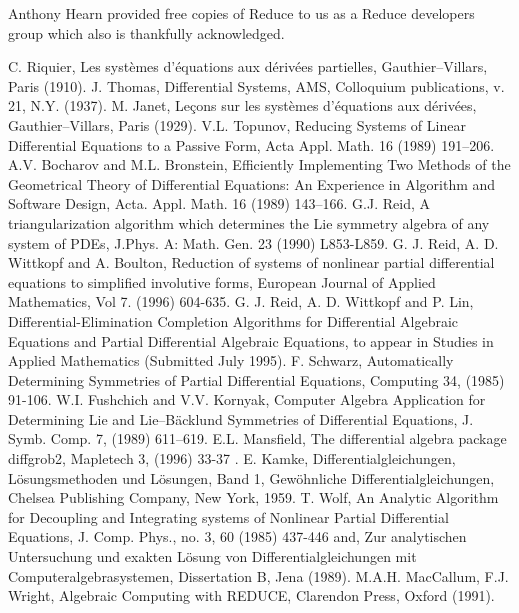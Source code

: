 \documentclass[12pt]{article}
\begin{document}
Anthony Hearn provided free copies of {\sc Reduce} to us as a
{\sc Reduce} developers group which also is thankfully acknowledged.

\begin{thebibliography}{99}
 C. Riquier, Les syst\`{e}mes d'\'{e}quations aux d\'{e}riv\'{e}es
partielles, Gauthier--Villars, Paris (1910).
 J. Thomas, Differential Systems, AMS, Colloquium
publications, v. 21, N.Y. (1937).
 M. Janet, Le\c{c}ons sur les syst\`{e}mes d'\'{e}quations aux 
d\'{e}riv\'{e}es, Gauthier--Villars, Paris (1929).
 V.L. Topunov, Reducing Systems of Linear Differential
Equations to a Passive Form, Acta Appl. Math. 16 (1989) 191--206.
 A.V. Bocharov and M.L. Bronstein, Efficiently
Implementing Two Methods of the Geometrical Theory of Differential
Equations: An Experience in Algorithm and Software Design, Acta. Appl.
Math. 16 (1989) 143--166.
 G.J. Reid, A triangularization algorithm which
determines the Lie symmetry algebra of any system of PDEs, J.Phys. A:
Math. Gen. 23 (1990) L853-L859.
 G. J. Reid, A. D. Wittkopf and A. Boulton, Reduction 
of systems of nonlinear partial differential equations to simplified
involutive forms, European Journal of Applied Mathematics,  
Vol 7. (1996) 604-635.
 G. J. Reid, A. D. Wittkopf and P. Lin, 
Differential-Elimination Completion Algorithms for Differential Algebraic
Equations and Partial Differential Algebraic Equations, to appear in
Studies in Applied Mathematics (Submitted July 1995).
 F. Schwarz, Automatically Determining Symmetries of Partial
Differential Equations, Computing 34, (1985) 91-106.
 W.I. Fushchich and V.V. Kornyak, Computer Algebra
Application for Determining Lie and Lie--B\"{a}cklund Symmetries of
Differential Equations, J. Symb. Comp. 7, (1989) 611--619.
 E.L. Mansfield,
The differential algebra package diffgrob2, Mapletech 3, (1996) 33-37 .
 E. Kamke, Differentialgleichungen, L\"{o}sungsmethoden
und L\"{o}sungen, Band 1, Gew\"{o}hnliche Differentialgleichungen,
Chelsea Publishing Company, New York, 1959.
 T. Wolf, An Analytic Algorithm for Decoupling and Integrating
systems of Nonlinear Partial Differential Equations, J. Comp. Phys.,
no. 3, 60 (1985) 437-446 and, Zur analytischen Untersuchung und exakten
L\"{o}sung von Differentialgleichungen mit Computeralgebrasystemen,
Dissertation B, Jena (1989).
 M.A.H. MacCallum, F.J. Wright, Algebraic Computing with REDUCE,
Clarendon Press, Oxford (1991).

\end{thebibliography}
\end{document}
